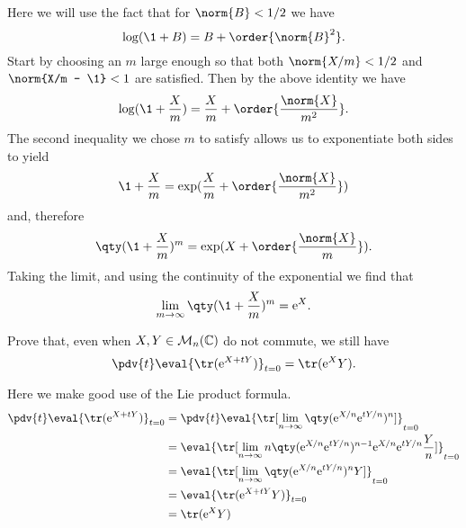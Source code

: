 \documentclass[
	pages,
	boxes,
	color=WildStrawberry
]{homework}
\begin{document}
\begin{solution}
	Here we will use the fact that for $\norm{B} < 1/2$ we have
	\begin{equation*}
		\log(\1 + B) = B + \order{\norm{B}^2}.
	\end{equation*}
	Start by choosing an $m$ large enough so that both $\norm{X/m} < 1/2$ and $\norm{X/m - \1} < 1$ are satisfied. Then by the above identity we have
	\begin{equation*}
		\log(\1 + \frac{X}{m}) = \frac{X}{m} + \order{\frac{\norm{X}}{m^2}}.
	\end{equation*}
	The second inequality we chose $m$ to satisfy allows us to exponentiate both sides to yield
	\begin{equation*}
		\1 + \frac{X}{m} = \exp(\frac{X}{m} + \order{\frac{\norm{X}}{m^2}})
	\end{equation*}
	and, therefore
	\begin{equation*}
		\qty(\1 + \frac{X}{m})^m = \exp(X + \order{\frac{\norm{X}}{m}}).
	\end{equation*}
	Taking the limit, and using the continuity of the exponential we find that
	\begin{equation*}
		\lim_{m\to\infty}\qty(\1 + \frac{X}{m})^m = \e^X.
	\end{equation*}
\end{solution}

\begin{problem}
Prove that, even when $X, Y\in\mathcal{M}_{n}(\mathbb{C})$ do not commute, we still have \[\pdv{t}\eval{\tr(\e^{X + tY})}_{t=0} = \tr(\e^{X}Y).\]
\end{problem}

\begin{solution}
	Here we make good use of the Lie product formula.
	\begin{align*}
		\pdv{t}\eval{\tr(\e^{X + tY})}_{t=0} & = \pdv{t}\eval{\tr[\lim_{n\to\infty}\qty(\e^{X/n}\e^{tY/n})^n]}_{t=0}                           \\
		                                     & = \eval{\tr[\lim_{n\to\infty}n\qty(\e^{X/n}\e^{tY/n})^{n-1}\e^{X/n}\e^{tY/n}\frac{Y}{n}]}_{t=0} \\
		                                     & = \eval{\tr[\lim_{n\to\infty}\qty(\e^{X/n}\e^{tY/n})^{n}Y]}_{t=0}                               \\
		                                     & = \eval{\tr(\e^{X+tY}Y)}_{t=0}                                                                  \\
		                                     & = \tr(\e^{X}Y)                                                                                  \\
	\end{align*}
\end{solution}
\end{document}
